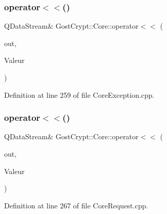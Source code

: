 \subsubsection{\texorpdfstring{operator$<$$<$()}{operator<<()}\hspace{0.1cm}{\footnotesize\ttfamily [50/56]}}
{\footnotesize\ttfamily Q\+Data\+Stream\& Gost\+Crypt\+::\+Core\+::operator$<$$<$ (\begin{DoxyParamCaption}\item[{Q\+Data\+Stream \&}]{out,  }\item[{const \hyperlink{class_gost_crypt_1_1_core_1_1_service_process_crashed}{Gost\+Crypt\+::\+Core\+::\+Service\+Process\+Crashed} \&}]{Valeur }\end{DoxyParamCaption})}



Definition at line 259 of file Core\+Exception.\+cpp.

\mbox{\label{namespace_gost_crypt_1_1_core_a1ed9186371e9ce4c0ab9bad297910414}} 
\subsubsection{\texorpdfstring{operator$<$$<$()}{operator<<()}\hspace{0.1cm}{\footnotesize\ttfamily [51/56]}}
{\footnotesize\ttfamily Q\+Data\+Stream\& Gost\+Crypt\+::\+Core\+::operator$<$$<$ (\begin{DoxyParamCaption}\item[{Q\+Data\+Stream \&}]{out,  }\item[{const \hyperlink{struct_gost_crypt_1_1_core_1_1_backup_header_request}{Backup\+Header\+Request} \&}]{Valeur }\end{DoxyParamCaption})}



Definition at line 267 of file Core\+Request.\+cpp.

\mbox{\label{namespace_gost_crypt_1_1_core_a0d293c1dffa157e3a6f62e0badb1515c}} 
